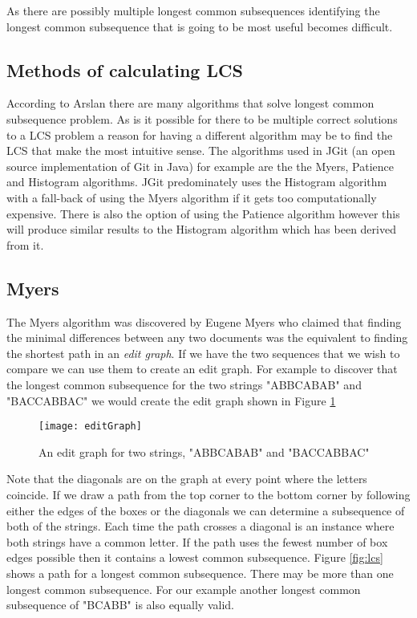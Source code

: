 As there are possibly multiple longest common subsequences identifying the longest common subsequence that is going to be most useful becomes difficult.

\subsection{Methods of calculating LCS}
According to Arslan \cite{Arslan2010} there are many algorithms that solve longest common subsequence problem. As is it possible for there to be multiple correct solutions to a LCS problem a reason for having a different algorithm may be to find the LCS that make the most intuitive sense. The algorithms used in JGit (an open source implementation of Git in Java) for example are the the Myers, Patience and Histogram algorithms. JGit predominately uses the Histogram algorithm with a fall-back of using the Myers algorithm if it gets too computationally expensive.  There is also the option of using the Patience algorithm however this will produce similar results to the Histogram algorithm which has been derived from it. 

\subsection{Myers}
The Myers algorithm was discovered by Eugene Myers \cite{Myers1986} who claimed that finding the minimal differences between any two documents was the equivalent to finding the shortest path in an \emph{edit graph}.  
If we have the two sequences that we wish to compare we can use them to create an edit graph. 
For example to discover that the longest common subsequence for the two strings "ABBCABAB" and "BACCABBAC" we would create the edit graph shown in Figure \ref{fig:editGraph}

\begin{figure}[!t]
 \begin{center}
 \texttt{[image: editGraph]}
 \end{center}
 \caption{An edit graph for two strings, "ABBCABAB" and "BACCABBAC"}
 \label{fig:editGraph}
\end{figure} 

Note that the diagonals are on the graph at every point where the letters coincide.
If we draw a path from the top corner to the bottom corner by following either the edges of the boxes or the diagonals we can determine a subsequence of both of the strings.
Each time the path crosses a diagonal is an instance where both strings have a common letter.
If the path uses the fewest number of box edges possible then it contains a lowest common subsequence.
Figure \ref{fig:lcs} shows a path for a longest common subsequence.
There may be more than one longest common subsequence.
For our example another longest common subsequence of "BCABB" is also equally valid.



